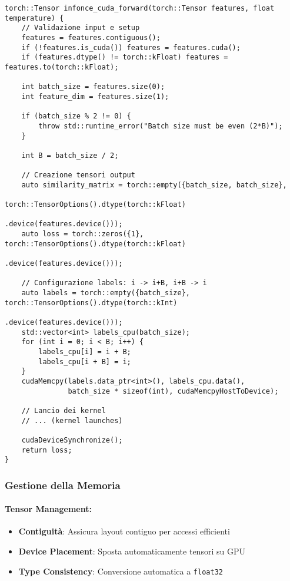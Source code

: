 \documentclass[a4paper,11pt]{article}
\begin{document}
\begin{lstlisting}[caption={Funzione forward C++}]
torch::Tensor infonce_cuda_forward(torch::Tensor features, float temperature) {
    // Validazione input e setup
    features = features.contiguous();
    if (!features.is_cuda()) features = features.cuda();
    if (features.dtype() != torch::kFloat) features = features.to(torch::kFloat);
    
    int batch_size = features.size(0);
    int feature_dim = features.size(1);
    
    if (batch_size % 2 != 0) {
        throw std::runtime_error("Batch size must be even (2*B)");
    }
    
    int B = batch_size / 2;
    
    // Creazione tensori output
    auto similarity_matrix = torch::empty({batch_size, batch_size}, 
                                        torch::TensorOptions().dtype(torch::kFloat)
                                                              .device(features.device()));
    auto loss = torch::zeros({1}, torch::TensorOptions().dtype(torch::kFloat)
                                                        .device(features.device()));
    
    // Configurazione labels: i -> i+B, i+B -> i
    auto labels = torch::empty({batch_size}, torch::TensorOptions().dtype(torch::kInt)
                                                                   .device(features.device()));
    std::vector<int> labels_cpu(batch_size);
    for (int i = 0; i < B; i++) {
        labels_cpu[i] = i + B;
        labels_cpu[i + B] = i;
    }
    cudaMemcpy(labels.data_ptr<int>(), labels_cpu.data(), 
               batch_size * sizeof(int), cudaMemcpyHostToDevice);
    
    // Lancio dei kernel
    // ... (kernel launches)
    
    cudaDeviceSynchronize();
    return loss;
}
\end{lstlisting}

\subsubsection{Gestione della Memoria}

\paragraph{Tensor Management:}
\begin{itemize}
    \item \textbf{Contiguità}: Assicura layout contiguo per accessi efficienti
    \item \textbf{Device Placement}: Sposta automaticamente tensori su GPU
    \item \textbf{Type Consistency}: Conversione automatica a \texttt{float32}
\end{itemize}
\end{document}

